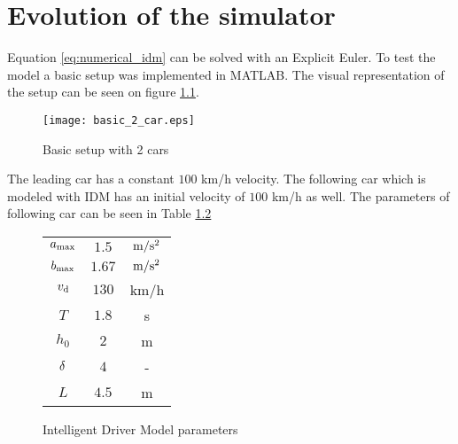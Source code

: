 \chapter{Evolution of the simulator}
	Equation \ref{eq:numerical_idm} can be solved with an Explicit Euler. To test the model a basic setup was implemented in MATLAB. The visual representation of the setup can be seen on figure \ref{fig:basic2car}.
	\begin{figure}[ht]
		\centering
		\texttt{[image: basic\_2\_car.eps]}
		\caption{Basic setup with 2 cars}
		\label{fig:basic2car}
	\end{figure}
	The leading car has a constant $100$ km/h velocity. The following car which is modeled with IDM has an initial velocity of $100$ km/h as well. The parameters of following car can be seen in Table \ref{table:idm_params}
	\begin{figure}[ht]
		\begin{center}
			\begin{tabular}{ |c|c|c| }
				\hline
				$a_{\rm max}$ & $1.5$ & $\rm m/s^2$ \\
				$b_{\rm max}$ & $1.67$ & $\rm m/s^2$ \\
				$v_{\rm d}$ & $130$ & km/h \\
				$T$ & $1.8$ & s \\
				$h_0$ & $2$ & m \\
				$\rm \delta$ & $4$ & - \\
				$L$ & $4.5$ & m \\
				\hline
			\end{tabular}
		\end{center}
		\caption{Intelligent Driver Model parameters}
		\label{table:idm_params}
	\end{figure}